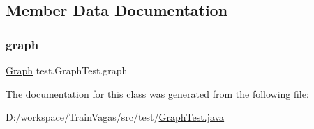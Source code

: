 \subsection{Member Data Documentation}
\mbox{\label{classtest_1_1_graph_test_ae9228c27cb865d920edd8b2eaad55b96}} 
\subsubsection{\texorpdfstring{graph}{graph}}
{\footnotesize\ttfamily \hyperlink{classdomain_1_1_graph}{Graph} test.\+Graph\+Test.\+graph\hspace{0.3cm}{\ttfamily [package]}}



The documentation for this class was generated from the following file\+:\begin{DoxyCompactItemize}
\item 
D\+:/workspace/\+Train\+Vagas/src/test/\hyperlink{_graph_test_8java}{Graph\+Test.\+java}\end{DoxyCompactItemize}
